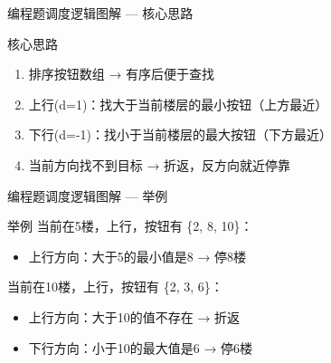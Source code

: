 \begin{frame}{编程题}{调度逻辑图解 --- 核心思路}
    \begin{block}{核心思路}
        \footnotesize
        \begin{enumerate}
            \setlength{\itemsep}{0pt}
            \item 排序按钮数组 → 有序后便于查找
            \item 上行(d=1)：找大于当前楼层的最小按钮（上方最近）
            \item 下行(d=-1)：找小于当前楼层的最大按钮（下方最近）
            \item 当前方向找不到目标 → 折返，反方向就近停靠
        \end{enumerate}
    \end{block}
\end{frame}

\begin{frame}{编程题}{调度逻辑图解 --- 举例}
    \begin{exampleblock}{举例}
        \footnotesize
        当前在5楼，上行，按钮有 \{2, 8, 10\}：
        \begin{itemize}
            \setlength{\itemsep}{0pt}
            \item 上行方向：大于5的最小值是8 → 停8楼
        \end{itemize}

        当前在10楼，上行，按钮有 \{2, 3, 6\}：
        \begin{itemize}
            \setlength{\itemsep}{0pt}
            \item 上行方向：大于10的值不存在 → 折返
            \item 下行方向：小于10的最大值是6 → 停6楼
        \end{itemize}
    \end{exampleblock}
\end{frame}
